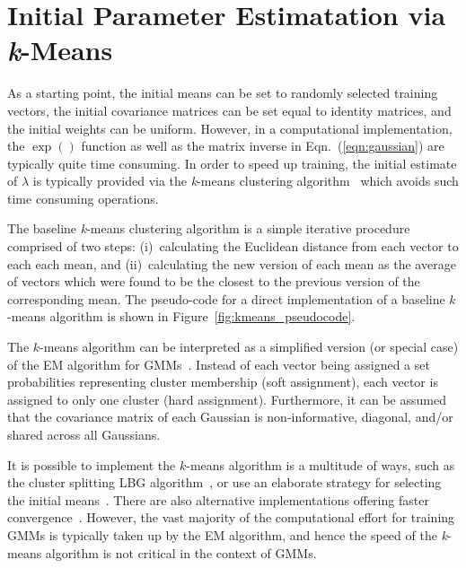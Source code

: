 \section{Initial Parameter Estimatation via {\it k}-Means}
\label{sec:param_km}

As a starting point, the initial means can be set to randomly selected training vectors,
the initial covariance matrices can be set equal to identity matrices, 
and the initial weights can be uniform.
However, in a computational implementation, the $\exp()$ function as well as the matrix inverse in Eqn.~(\ref{eqn:gaussian}) are typically quite time consuming.
In order to speed up training, the initial estimate of $\lambda$ is typically provided via the {\it k}-means clustering algorithm~\cite{Bishop_2006,Duda01,Kulis_2012}
which avoids such time consuming operations.

The baseline {\it k}-means clustering algorithm is a simple iterative procedure comprised of two steps:
(i)~calculating the Euclidean distance from each vector to each each mean,
and
(ii)~calculating the new version of each mean as the average of vectors which were found to be the closest to the previous version of the corresponding mean.
The pseudo-code for a direct implementation of a baseline $k$-means algorithm is shown in Figure~\ref{fig:kmeans_pseudocode}.

The $k$-means algorithm can be interpreted as a simplified version (or special case) of the EM algorithm for GMMs~\cite{Kulis_2012}.
Instead of each vector being assigned a set probabilities representing cluster membership (soft assignment),
each vector is assigned to only one cluster (hard assignment).
Furthermore, it can be assumed that the covariance matrix of each Gaussian is non-informative, diagonal, and/or shared across all Gaussians.

It is possible to implement the $k$-means algorithm is a multitude of ways,
such as the cluster splitting LBG algorithm~\cite{Linde80},
or use an elaborate strategy for selecting the initial means~\cite{Arthur_2007}.
There are also alternative implementations offering faster convergence~\cite{TODO,TODO}.
However, the vast majority of the computational effort for training GMMs is typically taken up by the EM algorithm,
and hence the speed of the {\it k}-means algorithm is not critical in the context of GMMs.


